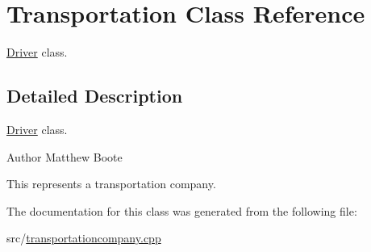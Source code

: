 \hypertarget{classTransportation}{}\section{Transportation Class Reference}
\label{classTransportation}


\hyperlink{classDriver}{Driver} class.  




\subsection{Detailed Description}
\hyperlink{classDriver}{Driver} class. 

\begin{DoxyAuthor}{Author}
Matthew Boote
\end{DoxyAuthor}
This represents a transportation company. 

The documentation for this class was generated from the following file\+:\begin{DoxyCompactItemize}
\item 
src/\hyperlink{transportationcompany_8cpp}{transportationcompany.\+cpp}\end{DoxyCompactItemize}
